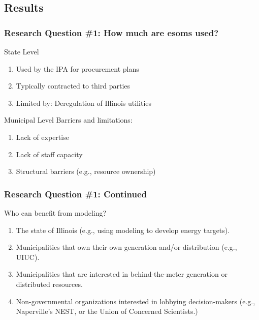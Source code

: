 \subsection{Results}
\begin{frame}
    \frametitle{Research Question \#1: How much are \glspl{esom} used?}
    \begin{block}{State Level}
        \begin{enumerate}
            \item Used by the IPA for procurement plans
            \item Typically contracted to third parties
            \item Limited by: Deregulation of Illinois utilities
        \end{enumerate}
    \end{block}
    \pause
    \begin{block}{Municipal Level}
        Barriers and limitations:    
        \begin{enumerate}
            \item Lack of expertise
            \item Lack of staff capacity
            \item Structural barriers (e.g., resource ownership)
        \end{enumerate}
    \end{block}
\end{frame}
\begin{frame}
    \frametitle{Research Question \#1: Continued}
    \begin{block}{Who can benefit from modeling?}
        \begin{enumerate}[<+->]
            \item The state of Illinois (e.g., using modeling to develop energy targets).
            \item Municipalities that own their own generation and/or distribution (e.g., UIUC).
            \item Municipalities that are interested in behind-the-meter generation or distributed resources.
            \item Non-governmental organizations interested in lobbying decision-makers (e.g., Naperville's NEST,
            or the Union of Concerned Scientists.)
        \end{enumerate}
    \end{block}
    
\end{frame}

